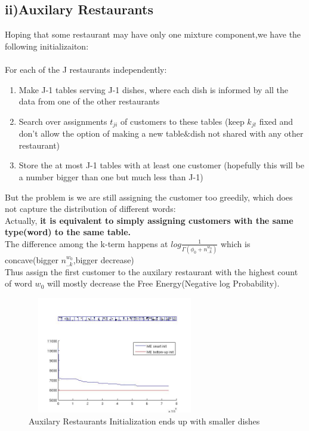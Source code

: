 \documentclass{article}
\begin{document}
\begin{spacing}{1.1}
\subsection{ii)Auxilary Restaurants}
Hoping that some restaurant may have only one mixture component,we have the following initializaiton:\\ \\
For each of the J restaurants independently:\\
\begin{enumerate}
 \item Make J-1 tables serving J-1 dishes, where each dish is informed by all the data from one of the other restaurants
\item  Search over assignments $t_{ji}$ of customers to these tables (keep $k_{jt}$ fixed and don't allow the option of making a new table$\&$dish not shared with any other restaurant)
\item  Store the at most J-1 tables with at least one customer (hopefully this will be a number bigger than one but much less than J-1)
\end{enumerate}
But the problem is we are still assigning the customer too greedily, which does not capture the distribution of different words:\\ 
Actually, {\bf it is equivalent to simply assigning customers with the same type(word) to the same table.} \\
The difference among the k-term happens at $log\frac{1}{\Gamma(\phi_{0}+n_{..k}^{w_{0}})}$ which is concave(bigger $n_{..k}^{w_{0}}$,bigger decrease)\\
Thus assign the first customer to the auxilary restaurant with the highest count of word $w_{0}$ will mostly decrease the Free Energy(Negative log Probability).
\begin{figure}[h] 
  \begin{minipage}[b]{0.5\textwidth} 
    \centering 
    \includegraphics[width=3in,height=2in]{greed.jpg} 
    \caption{Auxilary Restaurants Initialization ends up with smaller dishes} 

\end{minipage}
\end{figure}
\end{spacing}
\end{document}
